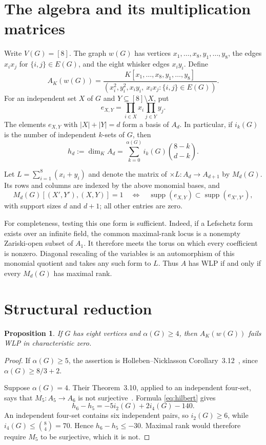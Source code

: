 \documentclass[11pt]{amsart}
\newtheorem{proposition}[theorem]{Proposition}
\begin{document}
\section{The algebra and its multiplication matrices}
Write $V(G)=[8]$. The graph $w(G)$ has vertices
$x_1,\ldots,x_8,y_1,\ldots,y_8$, the edges $x_ix_j$ for
$\{i,j\}\in E(G)$, and the eight whisker edges $x_iy_i$. Define
\[
A_K(w(G))=\frac{K[x_1,\ldots,x_8,y_1,\ldots,y_8]}
{(x_i^2,y_i^2,x_iy_i,\ x_ix_j:\{i,j\}\in E(G))}.
\]
For an independent set $X$ of $G$ and $Y\subseteq[8]\setminus X$, put
\[
 e_{X,Y}=\prod_{i\in X}x_i\prod_{j\in Y}y_j.
\]
The elements $e_{X,Y}$ with $|X|+|Y|=d$ form a basis of $A_d$. In
particular, if $i_k(G)$ is the number of independent $k$-sets of $G$, then
\begin{equation}\label{eq:hilbert}
 h_d:=\dim_K A_d=\sum_{k=0}^{\alpha(G)}i_k(G)\binom{8-k}{d-k}.
\end{equation}

Let $L=\sum_{i=1}^8(x_i+y_i)$ and denote the matrix of
$\times L:A_d\to A_{d+1}$ by $M_d(G)$. Its rows and columns are indexed by
the above monomial bases, and
\begin{equation}\label{eq:incidence}
 M_d(G)[(X',Y'),(X,Y)]=1
 \quad\Longleftrightarrow\quad
 \operatorname{supp}(e_{X,Y})\subset
 \operatorname{supp}(e_{X',Y'}),
\end{equation}
with support sizes $d$ and $d+1$; all other entries are zero.

For completeness, testing this one form is sufficient. Indeed, if a
Lefschetz form exists over an infinite field, the common maximal-rank locus
is a nonempty Zariski-open subset of $A_1$. It therefore meets the torus on
which every coefficient is nonzero. Diagonal rescaling of the variables is
an automorphism of this monomial quotient and takes any such form to $L$.
Thus $A$ has WLP if and only if every $M_d(G)$ has maximal rank.

\section{Structural reduction}
\begin{proposition}\label{prop:structural}
If $G$ has eight vertices and $\alpha(G)\geq4$, then $A_K(w(G))$ fails WLP
in characteristic zero.
\end{proposition}
\begin{proof}
If $\alpha(G)\geq5$, the assertion is Holleben--Nicklasson
Corollary~3.12~\cite{Holleben_2026}, since $\alpha(G)\geq 8/3+2$.

Suppose $\alpha(G)=4$. Their Theorem~3.10, applied to an independent
four-set, says that $M_5:A_5\to A_6$ is not
surjective~\cite[Theorem~3.10]{Holleben_2026}. Formula
\eqref{eq:hilbert} gives
\[
 h_6-h_5=-5i_2(G)+2i_4(G)-140.
\]
An independent four-set contains six independent pairs, so $i_2(G)\geq6$,
while $i_4(G)\leq\binom84=70$. Hence $h_6-h_5\leq-30$. Maximal rank
would therefore require $M_5$ to be surjective, which it is not.
\end{proof}
\end{document}
